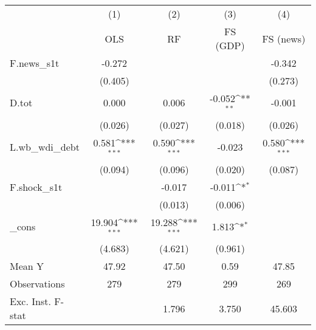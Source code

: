 {
\def\sym#1{\ifmmode^{#1}\else\(^{#1}\)\fi}
\begin{tabular}{l*{4}{c}}
\toprule
            &\multicolumn{1}{c}{(1)}&\multicolumn{1}{c}{(2)}&\multicolumn{1}{c}{(3)}&\multicolumn{1}{c}{(4)}\\
            &\multicolumn{1}{c}{OLS}&\multicolumn{1}{c}{RF}&\multicolumn{1}{c}{FS (GDP)}&\multicolumn{1}{c}{FS (news)}\\
\midrule
F.news\_s1t  &      -0.272         &                     &                     &      -0.342         \\
            &     (0.405)         &                     &                     &     (0.273)         \\
\addlinespace
D.tot       &       0.000         &       0.006         &      -0.052\sym{**} &      -0.001         \\
            &     (0.026)         &     (0.027)         &     (0.018)         &     (0.026)         \\
\addlinespace
L.wb\_wdi\_debt&       0.581\sym{***}&       0.590\sym{***}&      -0.023         &       0.580\sym{***}\\
            &     (0.094)         &     (0.096)         &     (0.020)         &     (0.087)         \\
\addlinespace
F.shock\_s1t &                     &      -0.017         &      -0.011\sym{*}  &                     \\
            &                     &     (0.013)         &     (0.006)         &                     \\
\addlinespace
\_cons      &      19.904\sym{***}&      19.288\sym{***}&       1.813\sym{*}  &                     \\
            &     (4.683)         &     (4.621)         &     (0.961)         &                     \\
\midrule
Mean Y      &       47.92         &       47.50         &        0.59         &       47.85         \\
Observations&         279         &         279         &         299         &         269         \\
Exc. Inst. F-stat&                     &       1.796         &       3.750         &      45.603         \\
\bottomrule
\end{tabular}
}
